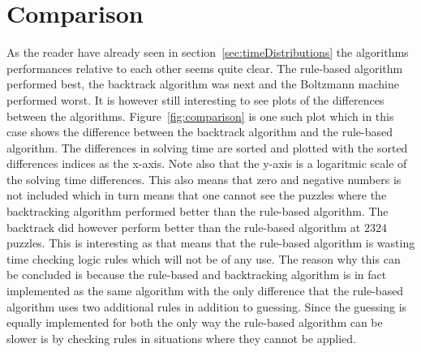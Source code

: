 \documentclass[a4paper,11pt]{kth-mag}
\begin{document}
\FloatBarrier
\section{Comparison}
\label{sec:comparisonAnalysis}
As the reader have already seen in section~\ref{sec:timeDistributions} the algorithms performances relative to each other seems quite clear.
The rule-based algorithm performed best, the backtrack algorithm was next and the Boltzmann machine performed worst.
It is however still interesting to see plots of the differences between the algorithms.
Figure~\ref{fig:comparison} is one such plot which in this case shows the difference between the backtrack algorithm and the rule-based algorithm. The differences in solving time are sorted and plotted with the sorted differences indices as the x-axis. Note also that the y-axis is a logaritmic scale of the solving time differences.
This also means that zero and negative numbers is not included which in turn means that one cannot see the puzzles where the backtracking algorithm performed better than the rule-based algorithm.
The backtrack did however perform better than the rule-based algorithm at $2324$ puzzles.
This is interesting as that means that the rule-based algorithm is wasting time checking logic rules which will not be of any use.
The reason why this can be concluded is because the rule-based and backtracking algorithm is in fact implemented as the same algorithm with the only difference that the rule-based algorithm uses two additional rules in addition to guessing.
Since the guessing is equally implemented for both the only way the rule-based algorithm can be slower is by checking rules in situations where they cannot be applied.
\\
\end{document}
